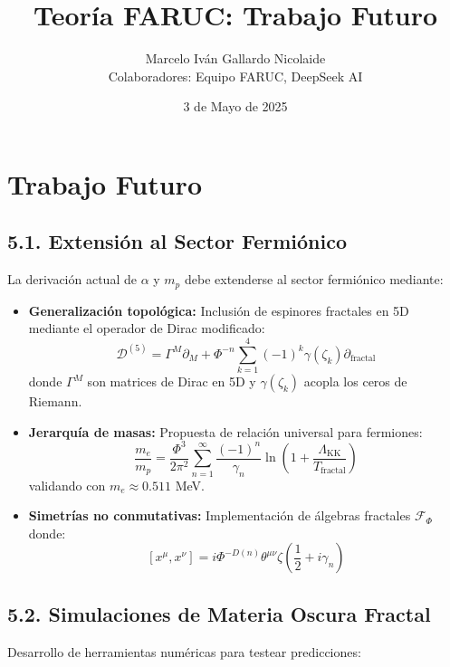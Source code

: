 \documentclass[a4paper, 12pt]{article}
\title{Teoría FARUC: Trabajo Futuro}
\author{Marcelo Iván Gallardo Nicolaide \\ Colaboradores: Equipo FARUC, DeepSeek AI}
\date{3 de Mayo de 2025}
\begin{document}
\maketitle

\section*{Trabajo Futuro}

\subsection*{5.1. Extensión al Sector Fermiónico}
La derivación actual de $\alpha$ y $m_p$ debe extenderse al sector fermiónico mediante:

\begin{itemize}
\item \textbf{Generalización topológica:} Inclusión de espinores fractales en 5D mediante el operador de Dirac modificado:
\[
\mathscr{D}^{(5)} = \Gamma^M\partial_M + \Phi^{-n}\sum_{k=1}^4(-1)^k\gamma(\zeta_k)\partial_{\text{fractal}}
\]
donde $\Gamma^M$ son matrices de Dirac en 5D y $\gamma(\zeta_k)$ acopla los ceros de Riemann.

\item \textbf{Jerarquía de masas:} Propuesta de relación universal para fermiones:
\[
\frac{m_e}{m_p} = \frac{\Phi^3}{2\pi^2}\sum_{n=1}^\infty \frac{(-1)^n}{\gamma_n}\ln\left(1 + \frac{\Lambda_{\text{KK}}}{T_{\text{fractal}}}\right)
\]
validando con $m_e \approx 0.511$ MeV.

\item \textbf{Simetrías no conmutativas:} Implementación de álgebras fractales $\mathscr{F}_\Phi$ donde:
\[
[x^\mu, x^\nu] = i\Phi^{-D(n)}\theta^{\mu\nu}\zeta(\frac{1}{2} + i\gamma_n)
\]
\end{itemize}

\subsection*{5.2. Simulaciones de Materia Oscura Fractal}
Desarrollo de herramientas numéricas para testear predicciones:
\end{document}
